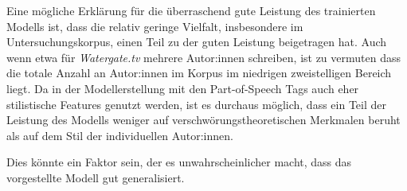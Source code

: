 Eine mögliche Erklärung für die überraschend gute Leistung des trainierten Modells ist, dass die relativ geringe Vielfalt, insbesondere im Untersuchungskorpus, einen Teil zu der guten Leistung beigetragen hat.
Auch wenn etwa für \textit{Watergate.tv} mehrere Autor:innen schreiben, ist zu vermuten dass die totale Anzahl an Autor:innen im Korpus im niedrigen zweistelligen Bereich liegt.
Da in der Modellerstellung mit den Part-of-Speech Tags auch eher stilistische Features genutzt werden, ist es durchaus möglich, dass ein Teil der Leistung des Modells weniger auf verschwörungstheoretischen Merkmalen beruht als auf dem Stil der individuellen Autor:innen.

Dies könnte ein Faktor sein, der es unwahrscheinlicher macht, dass das vorgestellte Modell gut generalisiert.